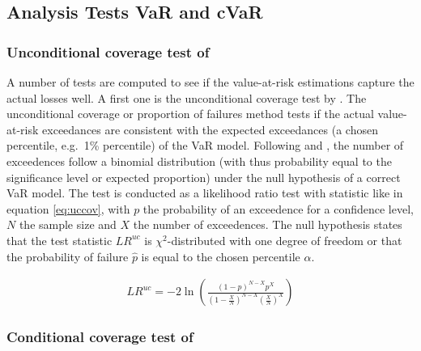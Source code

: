 \documentclass[a4paper, twoside]{templates/ociamthesis}
\begin{document}
\hypertarget{analysis-tests-var-and-cvar}{%
\subsection{Analysis Tests VaR and cVaR}\label{analysis-tests-var-and-cvar}}

\hypertarget{unconditional-coverage-test-of-kupiec1995}{%
\subsubsection{\texorpdfstring{Unconditional coverage test of \textcite{kupiec1995}}{Unconditional coverage test of @kupiec1995}}\label{unconditional-coverage-test-of-kupiec1995}}

\noindent A number of tests are computed to see if the value-at-risk estimations capture the actual losses well. A first one is the unconditional coverage test by \textcite{kupiec1995}. The unconditional coverage or proportion of failures method tests if the actual value-at-risk exceedances are consistent with the expected exceedances (a chosen percentile, e.g.~1\% percentile) of the VaR model. Following \textcite{kupiec1995} and \textcite{ghalanos2020}, the number of exceedences follow a binomial distribution (with thus probability equal to the significance level or expected proportion) under the null hypothesis of a correct VaR model. The test is conducted as a likelihood ratio test with statistic like in equation \eqref{eq:uccov}, with \(p\) the probability of an exceedence for a confidence level, \(N\) the sample size and \(X\) the number of exceedences. The null hypothesis states that the test statistic \(L R^{u c}\) is \(\chi^2\)-distributed with one degree of freedom or that the probability of failure \(\hat p\) is equal to the chosen percentile \(\alpha\).

\begin{align}
L R^{u c}=-2 \ln \left(\frac{(1-p)^{N-X} p^{X}}{\left(1-\frac{X}{N}\right)^{N-X}\left(\frac{X}{N}\right)^{X}}\right)
\label{eq:uccov}
\end{align}

\hypertarget{conditional-coverage-test-of-christoffersen2001}{%
\subsubsection{\texorpdfstring{Conditional coverage test of \textcite{christoffersen2001}}{Conditional coverage test of @christoffersen2001}}\label{conditional-coverage-test-of-christoffersen2001}}
\end{document}
